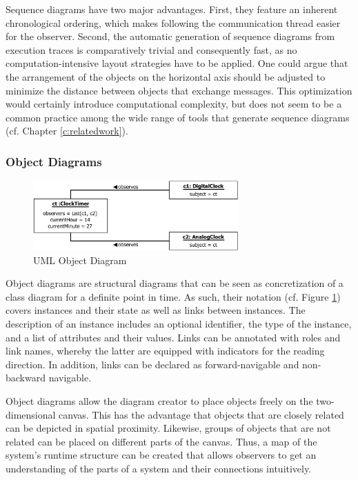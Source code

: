 Sequence diagrams have two major advantages.
First, they feature an inherent chronological ordering, which makes following the communication thread easier for the observer.
Second, the automatic generation of sequence diagrams from execution traces is comparatively trivial and consequently fast, as no computation-intensive layout strategies have to be applied.
One could argue that the arrangement of the objects on the horizontal axis should be adjusted to minimize the distance between objects that exchange messages.
This optimization would certainly introduce computational complexity, but does not seem to be a common practice among the wide range of tools that generate sequence diagrams (cf. Chapter \ref{c:relatedwork}).

\subsubsection{Object Diagrams}

\begin{figure}
	\centering
	\includegraphics[width=0.7\textwidth]{../images/02-Object}
	\caption{UML Object Diagram}
	\label{fig:BackgroundModelingObject}
\end{figure}

Object diagrams \cite{rumbaugh_unified_2010} are structural diagrams that can be seen as concretization of a class diagram for a definite point in time.
As such, their notation (cf. Figure \ref{fig:BackgroundModelingObject}) covers instances and their state as well as links between instances.
The description of an instance includes an optional identifier, the type of the instance, and a list of attributes and their values.
Links can be annotated with roles and link names, whereby the latter are equipped with indicators for the reading direction.
In addition, links can be declared as forward-navigable and non-backward navigable.

Object diagrams allow the diagram creator to place objects freely on the two-dimensional canvas.
This has the advantage that objects that are closely related can be depicted in spatial proximity.
Likewise, groups of objects that are not related can be placed on different parts of the canvas.
Thus, a map of the system's runtime structure can be created that allows observers to  get an understanding of the parts of a system and their connections intuitively.

